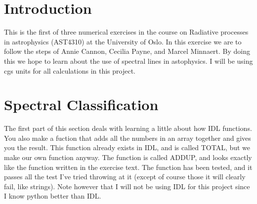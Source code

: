 \documentclass{aa}   %
\begin{document}
  



\section{Introduction}   \label{sec:Intro}
This is the first of three numerical exercises in the course on Radiative processes in astrophysics (AST4310) at the University of Oslo. In this exercise we are to follow the steps of Annie Cannon, Cecilia Payne, and Marcel Minnaert. By doing this we hope to learn about the use of spectral lines in astophysics. I will be using cgs units for all calculations in this project.


\section{Spectral Classification}    \label{sec:Specclas}
The first part of this section deals with learning a little about how IDL functions.
You also make a fuction that adds all the numbers in an array together and gives you the result.
This function already exists in IDL, and is called TOTAL, but we make our own function anyway.
The function is called ADDUP, and looks exactly like the function written in the exercise text.
The function has been tested, and it passes all the test I've tried throwing at it (except of course those it will clearly fail, like strings). Note however that I will not be using IDL for this project since I know python better than IDL.
\end{document}
